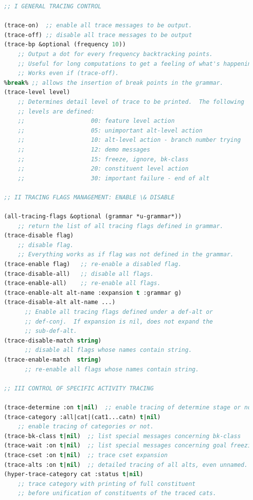 \documentclass[10pt,a4paper]{report}
\begin{document}
\begin{lstlisting}[language=Lisp]
;; I GENERAL TRACING CONTROL

(trace-on)  ;; enable all trace messages to be output.
(trace-off) ;; disable all trace messages to be output
(trace-bp &optional (frequency 10))
	;; Output a dot for every frequency backtracking points.
	;; Useful for long computations to get a feeling of what's happening.
	;; Works even if (trace-off).
%break%	;; allows the insertion of break points in the grammar.
(trace-level level)
	;; Determines detail level of trace to be printed.  The following
	;; levels are defined:
    ;;                   00: feature level action
    ;;                   05: unimportant alt-level action
    ;;                   10: alt-level action - branch number trying
    ;;                   12: demo messages
    ;;                   15: freeze, ignore, bk-class
    ;;                   20: constituent level action
    ;;                   30: important failure - end of alt

;; II TRACING FLAGS MANAGEMENT: ENABLE \& DISABLE

(all-tracing-flags &optional (grammar *u-grammar*))
    ;; return the list of all tracing flags defined in grammar.
(trace-disable flag)  
	;; disable flag.  
	;; Everything works as if flag was not defined in the grammar.
(trace-enable flag)   ;; re-enable a disabled flag.
(trace-disable-all)   ;; disable all flags.
(trace-enable-all)    ;; re-enable all flags.
(trace-enable-alt alt-name :expansion t :grammar g)
(trace-disable-alt alt-name ...)
	  ;; Enable all tracing flags defined under a def-alt or
	  ;; def-conj.  If expansion is nil, does not expand the
	  ;; sub-def-alt. 
(trace-disable-match string)
	  ;; disable all flags whose names contain string.
(trace-enable-match  string)
	  ;; re-enable all flags whose names contain string.

;; III CONTROL OF SPECIFIC ACTIVITY TRACING

(trace-determine :on t|nil)  ;; enable tracing of determine stage or not.
(trace-category :all|cat|(cat1...catn) t|nil) 
	;; enable tracing of categories or not.
(trace-bk-class t|nil)  ;; list special messages concerning bk-class
(trace-wait :on t|nil)  ;; list special messages concerning goal freezing
(trace-cset :on t|nil)  ;; trace cset expansion
(trace-alts :on t|nil)  ;; detailed tracing of all alts, even unnamed.
(hyper-trace-category cat :status t|nil)
	;; trace category with printing of full constituent
	;; before unification of constituents of the traced cats.
\end{lstlisting}
\end{document}

